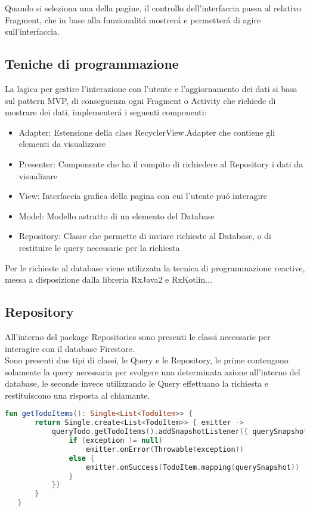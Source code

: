 Quando si seleziona una della pagine, il controllo dell'interfaccia passa al relativo Fragment, che in base alla funzionalit\'a mostrer\'a e permetter\'a di agire sull'interfaccia.\\


\subsection{Teniche di programmazione}
La lagica per gestire l'interazione con l'utente e l'aggiornamento dei dati si basa sul pattern MVP, di conseguenza ogni Fragment o Activity che richiede di mostrare dei dati, implementer\'a i seguenti componenti:
\begin{itemize}
    \item Adapter: Estensione della class RecyclerView.Adapter che contiene gli elementi da visualizzare
    \item Presenter: Componente che ha il compito di richiedere al Repository i dati da visualizare
    \item View: Interfaccia grafica della pagina con cui l'utente pu\'o interagire
    \item Model: Modello astratto di un elemento del Database
    \item Repository: Classe che permette di inviare richieste al Database, o di restituire le query necessarie per la richiesta
\end{itemize}

Per le richieste al database viene utilizzata la tecnica di programmazione reactive, messa a disposizione dalla libreria RxJava2 e RxKotlin...


\subsection{Repository}
All'interno del package Repositories sono presenti le classi necessarie per interagire con il database Firestore.\\
Sono presenti due tipi di classi, le Query e le Repository, le prime contengono solamente la query necessaria per svolgere una determinata azione all'interno del database, le seconde invece utilizzando le Query effettuano la richiesta e restituiscono una risposta al chiamante.
\begin{lstlisting}[language=kotlin,caption={Aggiunta elemento Todolist}]
fun getTodoItems(): Single<List<TodoItem>> {
       return Single.create<List<TodoItem>> { emitter ->
           queryTodo.getTodoItems().addSnapshotListener({ querySnapshot, exception ->
               if (exception != null)
                   emitter.onError(Throwable(exception))
               else {
                   emitter.onSuccess(TodoItem.mapping(querySnapshot))
               }
           })
       }
   }
\end{lstlisting}


